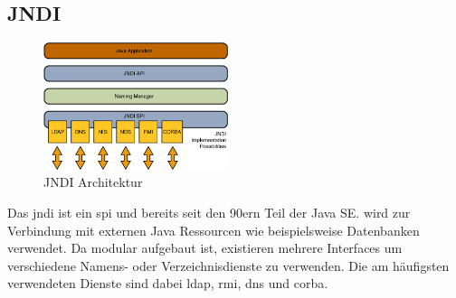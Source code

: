
\subsection{JNDI}\label{subsec:jndi}
\begin{figure}
    \begin{center}
        \includegraphics[width=0.48\textwidth]{images/jndiarch}
    \end{center}
    \caption{JNDI Architektur}
\end{figure}
Das \gls{jndi} ist ein \gls{spi} und bereits seit den 90ern Teil der Java SE.
 wird zur Verbindung mit externen Java Ressourcen wie beispielsweise Datenbanken verwendet.
Da  modular aufgebaut ist, existieren mehrere Interfaces um verschiedene Namens- oder Verzeichnisdienste zu verwenden.
Die am häufigsten verwendeten Dienste sind dabei \gls{ldap}, \gls{rmi}, \gls{dns} und \gls{corba}.
